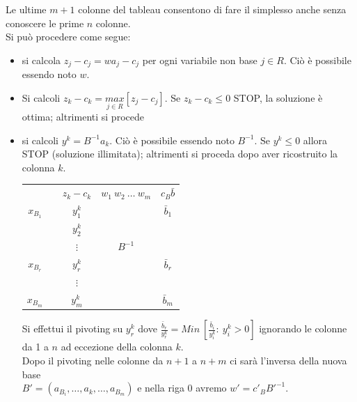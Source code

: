 Le ultime $m+1$ colonne del tableau consentono di fare il simplesso anche senza conoscere le prime $n$ colonne.\\
Si può procedere come segue:
\begin{itemize}
	\item si calcola $z_{j}-c_{j}=w a_{j}-c_{j}$ per ogni variabile non base $j\in R$. Ciò è possibile essendo noto $w$.
	\item Si calcoli $z_{k}-c_{k}=\underset{j\in R}{max}[z_{j}-c_{j}]$. Se $z_{k}-c_{k}\le 0$ STOP, la soluzione è ottima; altrimenti si procede
	\item si calcoli $y^{k}=B^{-1}a_{k}$. Ciò è possibile essendo noto $B^{-1}$.
	Se $y^{k}\le 0$ allora STOP (soluzione illimitata); altrimenti si proceda dopo aver ricostruito la colonna $k$.
	\begin{table}[h]
		\centering
		\begin{tabular}{c|c|c|c|c|}
			\cline{2-5}
			& & $z_{k}-c_{k}$ & $w_{1}\ w_{2}\ \dots\ w_{m}$ & $c_{B}\bar{b}$ \\ \cline{2-5}
			$x_{B_{1}}$ & & $y^{k}_{1}$ & & $\bar{b}_{1}$ \\
			&  & $y^{k}_{2}$ & & \\
			&  & $\vdots$ & $B^{-1}$ & \\
			$x_{B_{r}}$ & & $y^{k}_{r}$ &  & $\bar{b}_{r}$ \\
			&  & $\vdots$ &  & \\
			$x_{B_{m}}$ & & $y^{k}_{m}$ & & $\bar{b}_{m}$ \\ \cline{2-5}
		\end{tabular}
	\end{table}
	
	Si effettui il pivoting su $y_{r}^{k}$ dove $\frac{\bar{b}_{r}}{y_{r}^{k}}=Min\ [\frac{\bar{b}_{i}}{y^{k}_{i}}:\ y_{i}^{k}>0]$ ignorando le colonne da 1 a $n$ ad eccezione della colonna $k$.\\
	Dopo il pivoting nelle colonne da $n+1$ a $n+m$ ci sarà l'inversa della nuova base\\ $B'=(a_{B_{i}},\dots,a_{k},\dots,a_{B_{m}})$ e nella riga 0 avremo $w'=c'_{B}B'^{-1}$.
\end{itemize}


